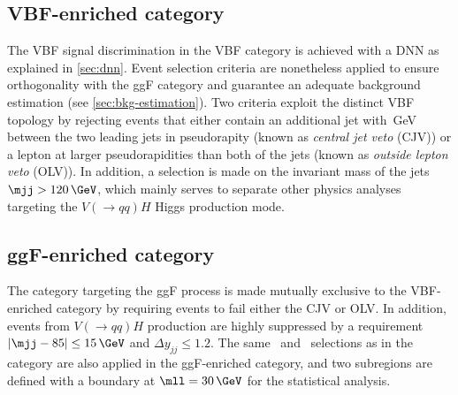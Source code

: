 \subsection{VBF-enriched \TwoJet category}
\label{subsec:vbf-category}
The VBF signal discrimination in the VBF \TwoJet category is achieved with a DNN as explained in \cref{sec:dnn}.
Event selection criteria are nonetheless applied to ensure orthogonality with the ggF \TwoJet category and guarantee an adequate background estimation (see \cref{sec:bkg-estimation}).
Two criteria exploit the distinct VBF topology by rejecting events that either contain an additional jet with \,GeV between the two leading jets in pseudorapity (known as \emph{central jet veto} (CJV)) or a lepton at larger pseudorapidities than both of the jets (known as \emph{outside lepton veto} (OLV)).
In addition, a selection is made on the invariant mass of the jets $\mjj > 120\,\GeV$, which mainly serves to separate other physics analyses targeting the $V(\to qq)H$ Higgs production mode.

\subsection{ggF-enriched \TwoJet category}
\label{subsec:ggf-two-jet-category}
The \TwoJet category targeting the ggF process is made mutually exclusive to the VBF-enriched \TwoJet category by requiring events to fail either the CJV or OLV. 
In addition, events from $V(\to qq) H$ production are highly suppressed by a requirement $|\mjj  - 85| \le 15\,\GeV$ and $\Delta y_{jj} \le 1.2$. 
The same \mll\ and \DPhill\ selections as in the \ZeroJet category are also applied in the ggF-enriched \TwoJet category, and two subregions are defined with a boundary at $\mll = 30\,\GeV$ for the statistical analysis. 

